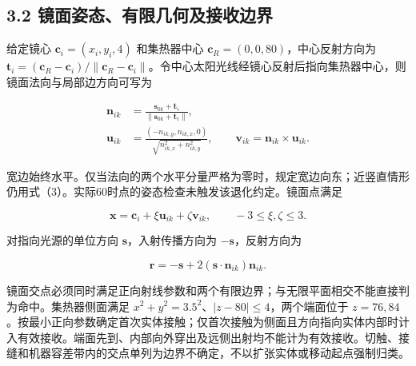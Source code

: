 \documentclass[UTF8,fontset=windows,zihao=-4]{ctexart}
\begin{document}
\subsection*{3.2 镜面姿态、有限几何及接收边界}

\par\noindent\begin{minipage}{\linewidth}
给定镜心 \(\boldsymbol c_i=(x_i,y_i,4)\) 和集热器中心 \(\boldsymbol c_R=(0,0,80)\)，中心反射方向为 \(\boldsymbol t_i=(\boldsymbol c_R-\boldsymbol c_i)/\|\boldsymbol c_R-\boldsymbol c_i\|\)。令中心太阳光线经镜心反射后指向集热器中心，则镜面法向与局部边方向可写为

\[
\begin{aligned}
\boldsymbol n_{ik}&=\frac{\boldsymbol s_{0k}+\boldsymbol t_i}{\|\boldsymbol s_{0k}+\boldsymbol t_i\|},\\
\boldsymbol u_{ik}&=\frac{(-n_{ik,y},n_{ik,x},0)}{\sqrt{n_{ik,x}^2+n_{ik,y}^2}},\qquad
\boldsymbol v_{ik}=\boldsymbol n_{ik}\times\boldsymbol u_{ik}.
\end{aligned}\tag{3}
\]
\end{minipage}\par

\par\noindent\begin{minipage}{\linewidth}
宽边始终水平。仅当法向的两个水平分量严格为零时，规定宽边向东；近竖直情形仍用式（3）。实际60时点的姿态检查未触发该退化约定。镜面点满足

\[
\boldsymbol x=\boldsymbol c_i+\xi\boldsymbol u_{ik}+\zeta\boldsymbol v_{ik},
\qquad -3\le\xi,\zeta\le3.
\tag{4}
\]
\end{minipage}\par

\par\noindent\begin{minipage}{\linewidth}
对指向光源的单位方向 \(\boldsymbol s\)，入射传播方向为 \(-\boldsymbol s\)，反射方向为

\[
\boldsymbol r=-\boldsymbol s+2(\boldsymbol s\cdot\boldsymbol n_{ik})\boldsymbol n_{ik}.
\tag{5}
\]
\end{minipage}\par

镜面交点必须同时满足正向射线参数和两个有限边界；与无限平面相交不能直接判为命中。集热器侧面满足 \(x^2+y^2=3.5^2\)、\(|z-80|\le4\)，两个端面位于 \(z=76,84\)。按最小正向参数确定首次实体接触；仅首次接触为侧面且方向指向实体内部时计入有效接收。端面先到、内部向外穿出及远侧出射均不能计为有效接收。切触、接缝和机器容差带内的交点单列为边界不确定，不以扩张实体或移动起点强制归类。
\end{document}
